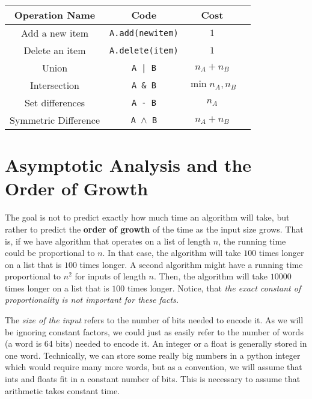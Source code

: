 \begin{tabular}{c c c c}

\hline


Operation Name & 
Code & 
Cost & 
\\
\hline



Add a new item &
\texttt{A.add(newitem)} &
$1$ &
\\

Delete an item &
\texttt{A.delete(item)} &
$1$ &
\\

Union &
\texttt{A | B} &
$n_A + n_B$ &
\\

Intersection &
\texttt{A \& B} &
$\min{n_A, n_B}$ &
\\

Set differences &
\texttt{A - B} &
$n_A$ &
\\

Symmetric Difference &
\texttt{A \ensuremath{\wedge} B} &
$n_A + n_B$ &
\\
\hline
\end{tabular}
\section{Asymptotic Analysis and the Order of Growth}


The goal is not to predict exactly how much time an algorithm will take, but rather to predict the \textbf{order of growth} of the time as the input size grows.
That is, if we have algorithm that operates on a list of length $n$, the running time could be proportional to $n$.
In that case, the algorithm will take $100$ times longer on a list that is $100$ times longer.
A second algorithm might have a running time proportional to $n^2$ for inputs of length $n$.
Then, the algorithm will take $10000$ times longer on a list that is $100$ times longer.
Notice, that \emph{the exact constant of proportionality is not important for these facts.}


The \emph{size of the input} refers to the number of bits needed to encode it.
As we will be ignoring constant factors, we could just as easily refer to the number of words (a word is 64 bits) needed to encode it.
An integer or a float is generally stored in one word.
Technically, we can store some really big numbers in a python integer which would require many more words, but as a convention, we will assume that ints and floats fit in a constant number of bits.
This is necessary to assume that arithmetic takes constant time.

